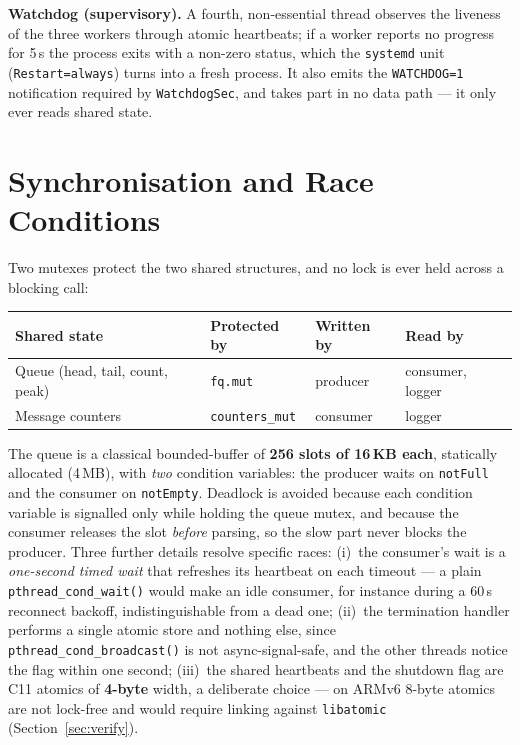 \documentclass[11pt,a4paper]{article}
\newcommand{\code}[1]{\texttt{\small #1}}
\begin{document}
\textbf{Watchdog (supervisory).} A fourth, non-essential thread observes the
liveness of the three workers through atomic heartbeats; if a worker reports no
progress for 5\,s the process exits with a non-zero status, which the
\code{systemd} unit (\code{Restart=always}) turns into a fresh process. It also
emits the \code{WATCHDOG=1} notification required by \code{WatchdogSec}, and
takes part in no data path --- it only ever reads shared state.

\section{Synchronisation and Race Conditions}

Two mutexes protect the two shared structures, and no lock is ever held across a
blocking call:

\begin{center}\small
\begin{tabular}{@{}llll@{}}
\toprule
\textbf{Shared state} & \textbf{Protected by} & \textbf{Written by} & \textbf{Read by}\\
\midrule
Queue (head, tail, count, peak) & \code{fq.mut}       & producer & consumer, logger\\
Message counters                & \code{counters\_mut} & consumer & logger\\
\bottomrule
\end{tabular}
\end{center}

The queue is a classical bounded-buffer of \textbf{256 slots of 16\,KB each},
statically allocated (4\,MB), with \emph{two} condition variables: the producer
waits on \code{notFull} and the consumer on \code{notEmpty}. Deadlock is avoided
because each condition variable is signalled only while holding the queue mutex,
and because the consumer releases the slot \emph{before} parsing, so the slow
part never blocks the producer. Three further details resolve specific races:
(i)~the consumer's wait is a \emph{one-second timed wait} that refreshes its
heartbeat on each timeout --- a plain \code{pthread\_cond\_wait()} would make an
idle consumer, for instance during a 60\,s reconnect backoff, indistinguishable
from a dead one; (ii)~the termination handler performs a single atomic store and
nothing else, since \code{pthread\_cond\_broadcast()} is not async-signal-safe,
and the other threads notice the flag within one second; (iii)~the shared
heartbeats and the shutdown flag are C11 atomics of \textbf{4-byte} width, a
deliberate choice --- on ARMv6 8-byte atomics are not lock-free and would require
linking against \code{libatomic} (Section~\ref{sec:verify}).
\end{document}
